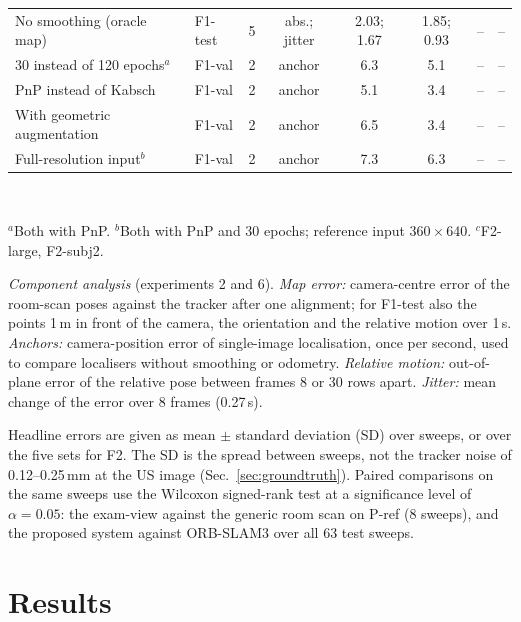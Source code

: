 \documentclass[9pt,shortpaper,twoside,web]{ieeecolor2}
\newcommand{\Pref}{P-ref}
\newcommand{\Fval}{F1-val}
\newcommand{\Ftest}{F1-test}
\newcommand{\Ftwo}{F2}
\newcommand{\Flarge}{F2-large}
\newcommand{\Fsubj}{F2-subj2}
\begin{document}
\begin{table}[!tb]
\begin{tabular}{@{}lllccccc@{}}
    No smoothing (oracle map) & \Ftest{} & 5 & abs.; jitter & 2.03; 1.67 & 1.85; 0.93 & -- & --\\
    30 instead of 120 epochs$^{a}$ & \Fval{} & 2 & anchor & 6.3 & 5.1 & -- & --\\
    PnP instead of Kabsch & \Fval{} & 2 & anchor & 5.1 & 3.4 & -- & --\\
    With geometric augmentation & \Fval{} & 2 & anchor & 6.5 & 3.4 & -- & --\\
    Full-resolution input$^{b}$ & \Fval{} & 2 & anchor & 7.3 & 6.3 & -- & --\\
    \bottomrule
  \end{tabular}\\[2pt]
  \raggedright\footnotesize $^{a}$Both with PnP. $^{b}$Both with PnP and 30 epochs; reference input $360\times640$. $^{c}$\Flarge{}, \Fsubj{}.
\end{table}

\emph{Component analysis} (experiments 2 and 6). \emph{Map error:} camera-centre error of the room-scan poses against the tracker after one alignment; for \Ftest{} also the points 1\,m in front of the camera, the orientation and the relative motion over 1\,s. \emph{Anchors:} camera-position error of single-image localisation, once per second, used to compare localisers without smoothing or odometry. \emph{Relative motion:} out-of-plane error of the relative pose between frames 8 or 30 rows apart. \emph{Jitter:} mean change of the error over 8 frames (0.27\,s).

Headline errors are given as mean $\pm$ standard deviation (SD) over sweeps, or over the five sets for \Ftwo{}. The SD is the spread between sweeps, not the tracker noise of 0.12--0.25\,mm at the US image (Sec.~\ref{sec:groundtruth}). Paired comparisons on the same sweeps use the Wilcoxon signed-rank test at a significance level of $\alpha=0.05$: the exam-view against the generic room scan on \Pref{} (8 sweeps), and the proposed system against ORB-SLAM3 over all 63 test sweeps.


\section{Results}
\label{sec:results}
\end{document}
